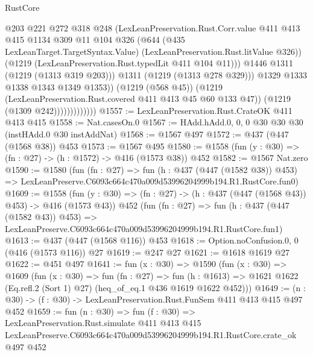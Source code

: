 \begin{lexlean}{RustCore}
\begin{coremodule}
                                  @203
                                  @221
                                  @272
                                  @318
                                  @248
                                  (LexLeanPreservation.Rust.Corr.value
                                    @411
                                    @413
                                    @415
                                    @1134
                                    @309
                                    @11
                                    @104
                                    @326
                                    (@644
                                      (@435 LexLeanTarget.TargetSyntax.Value)
                                      (LexLeanPreservation.Rust.litValue @326))
                                    (@1219 (LexLeanPreservation.Rust.typedLit @411 @104 @11)))
                                  @1446
                                  @1311
                                  (@1219 (@1313 @319 @203)))
                                @1311
                                (@1219 (@1313 @278 @329)))
                              @1329
                              @1333
                              @1338
                              @1343
                              @1349
                              @1353))
                          (@1219 (@568 @45))
                          (@1219 (LexLeanPreservation.Rust.covered @411 @413 @45 @60 @133 @47))
                          (@1219 (@1309 @242)))))))))))))
@1557 := LexLeanPreservation.Rust.CrateOK @411 @413 @415
@1558 := Nat.casesOn.{0}
@1567 := HAdd.hAdd.{0, 0, 0} @30 @30 @30 (instHAdd.{0} @30 instAddNat)
@1568 := @1567 @497
@1572 := @437 (@447 (@1568 @38)) @453
@1573 := @1567 @495
@1580 := @1558 (fun (y : @30) => (fn : @27) -> (h : @1572) -> @416 (@1573 @38)) @452
@1582 := @1567 Nat.zero
@1590 := @1580
    (fun (fn : @27) =>
    fun (h : @437 (@447 (@1582 @38)) @453) =>
    LexLeanPreserve.C6093c664c470a009d53996204999b194.R1.RustCore.fun0)
@1609 := @1558
    (fun (y : @30) => (fn : @27) -> (h : @437 (@447 (@1568 @43)) @453) -> @416 (@1573 @43))
    @452
    (fun (fn : @27) =>
    fun (h : @437 (@447 (@1582 @43)) @453) =>
    LexLeanPreserve.C6093c664c470a009d53996204999b194.R1.RustCore.fun1)
@1613 := @437 (@447 (@1568 @116)) @453
@1618 := Option.noConfusion.{0, 0} (@416 (@1573 @116)) @27
@1619 := @247 @27
@1621 := @1618 @1619 @27
@1622 := @451 @497
@1641 := fun (x : @30) =>
  @1590
    (fun (x : @30) =>
    @1609
      (fun (x : @30) =>
      fun (fn : @27) =>
      fun (h : @1613) =>
      @1621 @1622 (Eq.refl.{2} (Sort 1) @27) (heq_of_eq.{1} @436 @1619 @1622 @452)))
@1649 := (n : @30) -> (f : @30) -> LexLeanPreservation.Rust.FunSem @411 @413 @415 @497 @452
@1659 := fun (n : @30) =>
  fun (f : @30) =>
  LexLeanPreservation.Rust.simulate
    @411
    @413
    @415
    LexLeanPreserve.C6093c664c470a009d53996204999b194.R1.RustCore.crate_ok
    @497
    @452
\end{coremodule}
\end{lexlean}
